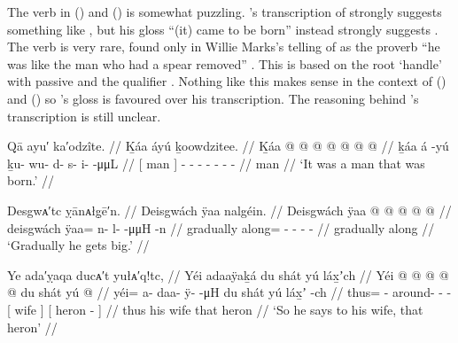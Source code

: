 The verb in (\lastx) and (\nextx) is somewhat puzzling. \citeauthor{swanton:1909}’s transcription of  strongly suggests something like , but his gloss “(it) came to be born” instead strongly suggests .
The verb  is very rare, found only in  Willie Marks’s telling of  as the proverb  “he was like the man who had a spear removed” \parencite[114.95]{dauenhauer:1987}.
This is based on the root  ‘handle’ with passive  and the qualifier .
Nothing like this makes sense in the context of (\lastx) and (\nextx) so \citeauthor{swanton:1909}’s gloss is favoured over his transcription.
The reasoning behind \citeauthor{swanton:1909}’s transcription is still unclear.

\ex\label{ex:91-142-a-man-was-born}%
%
\begingl
	\glpreamble	Qā ayu′ ka′odzîte. //
	\glpreamble	Ḵáa áyú ḵoowdzitee. //
	\gla	{} Ḵáa {}  @ {}
		 @ {} @ {} @ {} @ {} @ {} @ {} //
	\glb	{} ḵáa {} á -yú
		ḵu- wu- d- s- i-  -μμL //
	\glc	{}[ man {}]  -
		- - - - -  - //
	\gld	{} man {}  {}
		 {} {} {} {} {} {} //
	\glft	‘It was a man that was born.’
		//
\endgl
\xe

\ex\label{ex:91-143-gradually-big}%
%
\begingl
	\glpreamble	Desgwᴀ′tc ỵānᴀłg̣ē′n. //
	\glpreamble	Deisgwách ÿaa nalgéin. //
	\gla	Deisgwách ÿaa @  @ {} @ {} @ {} @ {} //
	\glb	deisgwách ÿaa= n- l-  -μμH -n //
	\glc	gradually along= - -  - - //
	\gld	gradually along  {} {} {} {} //
	\glft	‘Gradually he gets big.’
		//
\endgl
\xe


\ex\label{ex:91-144-says-to-wife-heron}%
%
\begingl
	\glpreamble	Ye ada′ỵaqa ducᴀ′t yułᴀ′q!tc, //
	\glpreamble	Yéi adaaÿaḵá du shát yú láx̱ʼch //
	\gla	Yéi @  @ {} @ {} @ {} @ {} 
		{} du shát {}
		{} yú  @ {} {} //
	\glb	yéi= a- daa- ÿ-  -μH
		{} du shát {}
		{} yú láx̱ʼ -ch {}  //
	\glc	thus= - around- -  -
		{}[  wife {}]
		{}[  heron - {}] //
	\gld	thus  {} {} {} {}
		{} his wife {}
		{} that heron {} {} //
	\glft	‘So he says to his wife, that heron’
		//
\endgl
\xe

